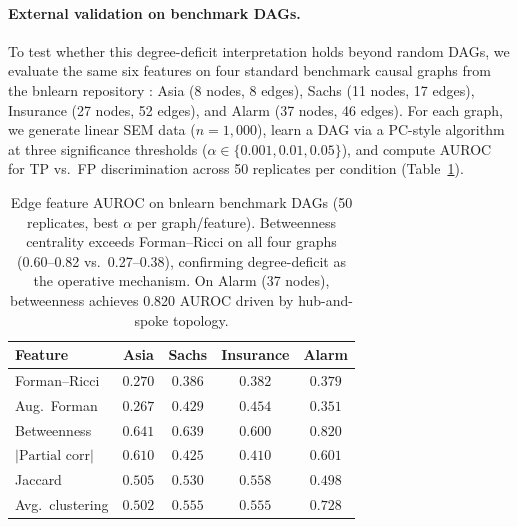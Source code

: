 \documentclass{article}
\begin{document}
\paragraph{External validation on benchmark DAGs.}
To test whether this degree-deficit interpretation holds beyond random DAGs, we evaluate the same six features on four standard benchmark causal graphs from the bnlearn repository \citep{scutari2010learning}: Asia (8 nodes, 8 edges), Sachs (11 nodes, 17 edges), Insurance (27 nodes, 52 edges), and Alarm (37 nodes, 46 edges). For each graph, we generate linear SEM data ($n = 1{,}000$), learn a DAG via a PC-style algorithm at three significance thresholds ($\alpha \in \{0.001, 0.01, 0.05\}$), and compute AUROC for TP vs.\ FP discrimination across 50 replicates per condition (Table~\ref{tab:bnlearn}).

\begin{table}[t]
\centering
\caption{Edge feature AUROC on bnlearn benchmark DAGs (50 replicates, best $\alpha$ per graph/feature). Betweenness centrality exceeds Forman--Ricci on all four graphs (0.60--0.82 vs.\ 0.27--0.38), confirming degree-deficit as the operative mechanism. On Alarm (37 nodes), betweenness achieves 0.820 AUROC driven by hub-and-spoke topology.}
\label{tab:bnlearn}
\small
\begin{tabular}{@{}lcccc@{}}
\toprule
\textbf{Feature} & \textbf{Asia} & \textbf{Sachs} & \textbf{Insurance} & \textbf{Alarm} \\
\midrule
Forman--Ricci & $0.270$ & $0.386$ & $0.382$ & $0.379$ \\
Aug.\ Forman & $0.267$ & $0.429$ & $0.454$ & $0.351$ \\
Betweenness & $\mathbf{0.641}$ & $\mathbf{0.639}$ & $\mathbf{0.600}$ & $\mathbf{0.820}$ \\
$|\text{Partial corr}|$ & $0.610$ & $0.425$ & $0.410$ & $0.601$ \\
Jaccard & $0.505$ & $0.530$ & $0.558$ & $0.498$ \\
Avg.\ clustering & $0.502$ & $0.555$ & $0.555$ & $0.728$ \\
\bottomrule
\end{tabular}
\end{table}
\end{document}
